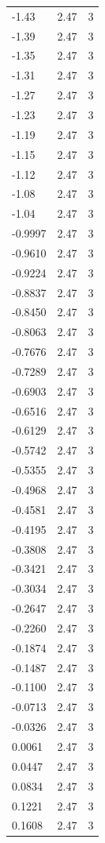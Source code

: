 \begin{longtable}{lrr}
  -1.43 & 2.47 & 3 \\
  -1.39 & 2.47 & 3 \\
  -1.35 & 2.47 & 3 \\
  -1.31 & 2.47 & 3 \\
  -1.27 & 2.47 & 3 \\
  -1.23 & 2.47 & 3 \\
  -1.19 & 2.47 & 3 \\
  -1.15 & 2.47 & 3 \\
  -1.12 & 2.47 & 3 \\
  -1.08 & 2.47 & 3 \\
  -1.04 & 2.47 & 3 \\
  -0.9997 & 2.47 & 3 \\
  -0.9610 & 2.47 & 3 \\
  -0.9224 & 2.47 & 3 \\
  -0.8837 & 2.47 & 3 \\
  -0.8450 & 2.47 & 3 \\
  -0.8063 & 2.47 & 3 \\
  -0.7676 & 2.47 & 3 \\
  -0.7289 & 2.47 & 3 \\
  -0.6903 & 2.47 & 3 \\
  -0.6516 & 2.47 & 3 \\
  -0.6129 & 2.47 & 3 \\
  -0.5742 & 2.47 & 3 \\
  -0.5355 & 2.47 & 3 \\
  -0.4968 & 2.47 & 3 \\
  -0.4581 & 2.47 & 3 \\
  -0.4195 & 2.47 & 3 \\
  -0.3808 & 2.47 & 3 \\
  -0.3421 & 2.47 & 3 \\
  -0.3034 & 2.47 & 3 \\
  -0.2647 & 2.47 & 3 \\
  -0.2260 & 2.47 & 3 \\
  -0.1874 & 2.47 & 3 \\
  -0.1487 & 2.47 & 3 \\
  -0.1100 & 2.47 & 3 \\
  -0.0713 & 2.47 & 3 \\
  -0.0326 & 2.47 & 3 \\
  0.0061 & 2.47 & 3 \\
  0.0447 & 2.47 & 3 \\
  0.0834 & 2.47 & 3 \\
  0.1221 & 2.47 & 3 \\
  0.1608 & 2.47 & 3 \\

\end{longtable}
